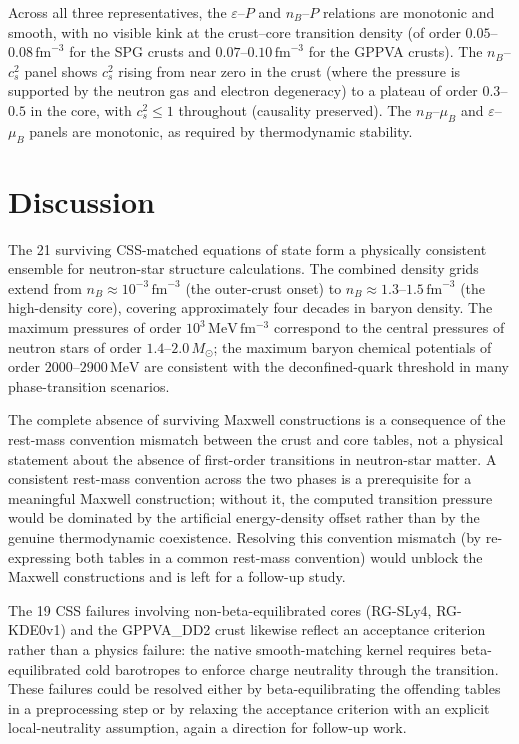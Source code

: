 \documentclass[aps,prc,reprint,notitlepage]{revtex4-2}
\newcommand{\fmthree}{\,\mathrm{fm}^{-3}}
\newcommand{\msun}{M_{\odot}}
\begin{document}
Across all three representatives, the $\varepsilon$--$P$ and $n_B$--$P$
relations are monotonic and smooth, with no visible kink at the
crust--core transition density (of order $0.05$--$0.08\fmthree$ for the SPG
crusts and $0.07$--$0.10\fmthree$ for the GPPVA crusts).  The $n_B$--$c_s^2$
panel shows $c_s^2$ rising from near zero in the crust (where the pressure
is supported by the neutron gas and electron degeneracy) to a plateau of
order $0.3$--$0.5$ in the core, with $c_s^2 \le 1$ throughout (causality
preserved).  The $n_B$--$\mu_B$ and $\varepsilon$--$\mu_B$ panels are
monotonic, as required by thermodynamic stability.

\section{Discussion}\label{sec:discussion}

The 21 surviving CSS-matched equations of state form a physically
consistent ensemble for neutron-star structure calculations.  The
combined density grids extend from $n_B \approx 10^{-3}\fmthree$ (the
outer-crust onset) to $n_B \approx 1.3$--$1.5\fmthree$ (the high-density
core), covering approximately four decades in baryon density.  The maximum
pressures of order $10^3\,\mathrm{MeV\,fm^{-3}}$ correspond to the central
pressures of neutron stars of order $1.4$--$2.0\,\msun$; the maximum baryon
chemical potentials of order $2000$--$2900\,\mathrm{MeV}$ are consistent
with the deconfined-quark threshold in many phase-transition scenarios.

The complete absence of surviving Maxwell constructions is a consequence
of the rest-mass convention mismatch between the crust and core tables,
not a physical statement about the absence of first-order transitions in
neutron-star matter.  A consistent rest-mass convention across the two
phases is a prerequisite for a meaningful Maxwell construction; without
it, the computed transition pressure would be dominated by the artificial
energy-density offset rather than by the genuine thermodynamic
coexistence.  Resolving this convention mismatch (by re-expressing both
tables in a common rest-mass convention) would unblock the Maxwell
constructions and is left for a follow-up study.

The 19 CSS failures involving non-beta-equilibrated cores (RG-SLy4,
RG-KDE0v1) and the GPPVA\_DD2 crust likewise reflect an acceptance
criterion rather than a physics failure: the native smooth-matching kernel
requires beta-equilibrated cold barotropes to enforce charge neutrality
through the transition.  These failures could be resolved either by
beta-equilibrating the offending tables in a preprocessing step or by
relaxing the acceptance criterion with an explicit local-neutrality
assumption, again a direction for follow-up work.
\end{document}
